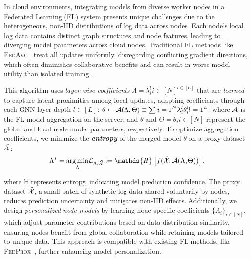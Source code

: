 In cloud environments, integrating models from diverse worker nodes in a Federated Learning (FL) system presents unique challenges due to the heterogeneous, non-IID distributions of log data across nodes. Each node's local log data contains distinct graph structures and node features, leading to diverging model parameters across cloud nodes. Traditional FL methods like \textsc{FedAvg}~\cite{mcmahan2017communication} treat all updates uniformly, disregarding conflicting gradient directions, which often diminishes collaborative benefits and can result in worse model utility than isolated training.

 This algorithm uses \textit{layer-wise coefficients} $\Lambda = {\lambda_{i}^l}{i \in [N]}^{l \in [L]}$ that are \textit{learned} to capture latent proximities among local updates, adapting coefficients through each GNN layer depth $l \in [L]$: $\theta \leftarrow {\mathcal{A}}(\Lambda, \Theta) \equiv { \sum{i=1}^N \lambda_i^l \theta_{i}^{l}}{l=1}^L$, where ${\mathcal{A}}$ is the FL model aggregation on the server, and $\theta$ and $\Theta={\theta_i}{i\in[N]}$ represent the global and local node model parameters, respectively. To optimize aggregation coefficients, we minimize the \textbf{\textit{entropy}} of the merged model $\theta$ on a proxy dataset $\tilde{{\mathcal{X}}}$:
\vspace{-1ex}
\[
\Lambda^* = \underset{\Lambda}{\arg\min} \gL_{\Lambda, \tilde{\gX}} :=   \mathds{H} \left[   f(\tilde{\gX}; \gA(\Lambda, \Theta) ) \right],
\]
\vspace{-3ex}

where $\mathds{H}$ represents entropy, indicating model prediction confidence. The proxy dataset $\tilde{{\mathcal{X}}}$, a small batch of synthetic log data shared voluntarily by nodes, reduces prediction uncertainty and mitigates non-IID effects. Additionally, we design \textit{personalized node models} by learning node-specific coefficients $\{\Lambda_{i}\}_{i\in[N]}$, which adjust parameter contributions based on data distribution similarity, ensuring nodes benefit from global collaboration while retaining models tailored to unique data. This approach is compatible with existing FL methods, like \textsc{FedProx}~\cite{li2020federated}, further enhancing model personalization.

